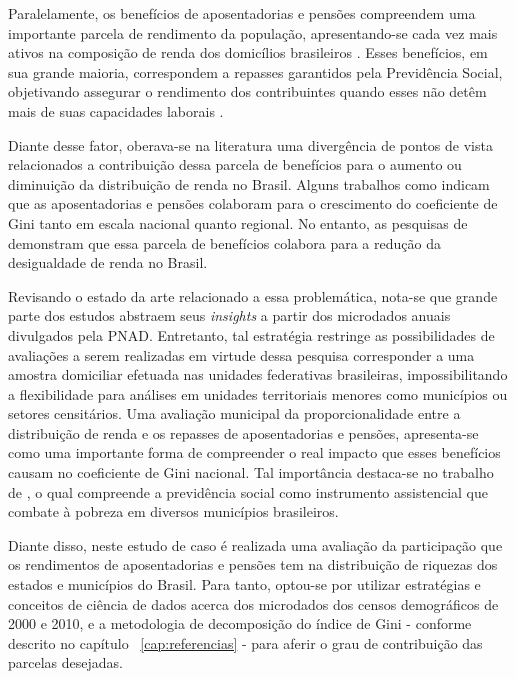 Paralelamente, os benefícios de aposentadorias e pensões compreendem uma importante parcela de rendimento da população, apresentando-se cada vez mais ativos na composição de renda dos domicílios brasileiros \cite{cap02_ref22, cap04_ref5}. Esses benefícios, em sua grande maioria, correspondem a repasses garantidos pela Previdência Social, objetivando assegurar o rendimento dos contribuintes quando esses não detêm mais de suas capacidades laborais \cite{cap04_ref6}.

Diante desse fator, oberava-se na literatura uma divergência de pontos de vista relacionados a contribuição dessa parcela de benefícios para o aumento ou diminuição da distribuição de renda no Brasil. Alguns trabalhos como \cite{cap04_ref7, cap04_ref8, cap04_ref9} indicam que as aposentadorias e pensões colaboram para o crescimento do coeficiente de Gini tanto em escala nacional quanto regional. No entanto, as pesquisas de \cite{cap04_ref10, cap04_ref11} demonstram que essa parcela de benefícios colabora para a redução da desigualdade de renda no Brasil.

Revisando o estado da arte relacionado a essa problemática, nota-se que grande parte dos estudos abstraem seus \textit{insights} a partir dos microdados anuais divulgados pela PNAD. Entretanto, tal estratégia restringe as possibilidades de avaliações a serem realizadas em virtude dessa pesquisa corresponder a uma amostra domiciliar efetuada nas unidades federativas brasileiras, impossibilitando a flexibilidade para análises em unidades territoriais menores como municípios ou setores censitários. Uma avaliação municipal da proporcionalidade entre a distribuição de renda e os repasses de aposentadorias e pensões, apresenta-se como uma importante forma de compreender o real impacto que esses benefícios causam no coeficiente de Gini nacional. Tal importância destaca-se no trabalho de \cite{cap04_ref12}, o qual compreende a previdência social como instrumento assistencial que combate à pobreza em diversos municípios brasileiros.

Diante disso, neste estudo de caso é realizada uma avaliação da participação que os rendimentos de aposentadorias e pensões tem na distribuição de riquezas dos estados e municípios do Brasil. Para tanto, optou-se por utilizar estratégias e conceitos de ciência de dados acerca dos microdados dos censos demográficos de 2000 e 2010, e a metodologia de decomposição do índice de Gini - conforme descrito no capítulo ~\ref{cap:referencias} - para aferir o grau de contribuição das parcelas desejadas.

